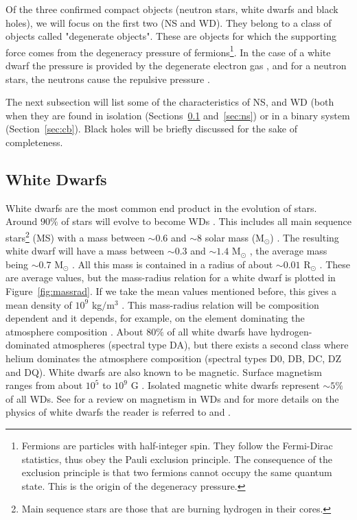 Of the three confirmed compact objects (neutron stars, white dwarfs and black holes), we will focus on the first two (NS and WD). They belong to a class of objects called "degenerate objects". These are objects for which the supporting force comes from the degeneracy pressure of fermions\footnote{Fermions are particles with half-integer spin. They follow the Fermi-Dirac statistics, thus obey the Pauli exclusion principle. The consequence of the exclusion principle is that two fermions cannot occupy the same quantum state. This is the origin of the degeneracy pressure. }. In the case of a white dwarf the pressure is provided by the degenerate electron gas \citep{fowler_dense_1926}, and for a neutron stars, the neutrons cause the repulsive pressure \citep{1939PhRv...55..374O}. 

The next subsection will list some of the characteristics of NS, and WD (both when they are found in isolation (Sections~\ref{sec:wd} and~\ref{sec:ns}) or in a binary system (Section~\ref{sec:cb}). Black holes will be briefly discussed for the sake of completeness. 


\subsection[White Dwarfs]{White Dwarfs}\label{sec:wd} 

White dwarfs are the most common end product in the evolution of stars. Around $90 \%$ of stars will evolve to become WDs \citep{koester_white_1980}. This includes all main sequence stars\footnote{Main sequence stars are those that are burning hydrogen in their cores.} (MS) with a mass between $\sim 0.6$ and  $\sim 8$ solar mass (M$_\odot$) \citep{koester_physics_1990}. The resulting white dwarf will have a mass between $\sim 0.3$ and $\sim 1.4$ M$_\odot$ \citep{prada_moroni_very_2009,chandrasekhar_maximum_1931}, the average mass being $\sim 0.7$ M$_\odot$ \citep{koester_physics_1990}. All this mass is contained in a radius of about $\sim 0.01$ R$_\odot$ \citep{kepler_structure_1995}. These are average values, but the mass-radius relation for a white dwarf is plotted in Figure~\ref{fig:massrad}. If we take the mean values mentioned before, this gives a mean density of $10^9$ kg$/$m$^3$ . This mass-radius relation will be composition dependent and it depends, for example, on the element dominating the atmosphere composition \citep{hamada_models_1961}. About $80 \%$ of all white dwarfs have hydrogen-dominated atmospheres (spectral type DA), but there exists a second class where helium dominates the atmosphere composition (spectral types D0, DB, DC, DZ and DQ)\citep{wickramasinghe_magnetism_2000,koester_physics_1990}. White dwarfs are also known to be magnetic. Surface magnetism ranges from about $10^5$ to $10^9$ G \citep{suh_mass-radius_2000}. Isolated magnetic white dwarfs represent $\sim 5 \%$ of all WDs. See \cite{wickramasinghe_magnetism_2000} for a review on magnetism in WDs and for more details on the physics of white dwarfs the reader is referred to \cite{koester_physics_1990} and \cite{kepler_structure_1995}.

